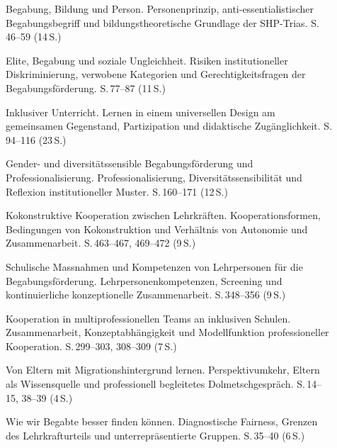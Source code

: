 \documentclass[ngerman, a4paper]{article}
\begin{document}
\begin{description}
  \item[\cite{weigand2021person}] Begabung, Bildung und Person.
        Personenprinzip, anti-essentialistischer Begabungsbegriff und
        bildungstheoretische Grundlage der SHP-Trias. S.\,46--59 (14\,S.)

  \item[\cite{horvath2021elite}] Elite, Begabung und soziale Ungleichheit.
        Risiken institutioneller Diskriminierung, verwobene Kategorien und
        Gerechtigkeitsfragen der Begabungsförderung. S.\,77--87 (11\,S.)

  \item[\cite{muellerboeschschaffnermenn2021udl}] Inklusiver Unterricht.
        Lernen in einem universellen Design am gemeinsamen Gegenstand,
        Partizipation und didaktische Zugänglichkeit. S.\,94--116 (23\,S.)

  \item[\cite{macha2019gender}] Gender- und diversitätssensible
        Begabungsförderung und Professionalisierung. Professionalisierung,
        Diversitätssensibilität und Reflexion institutioneller Muster.
        S.\,160--171 (12\,S.)

  \item[\cite{groschefussangelgraesel2020kokonstruktion}] Kokonstruktive
        Kooperation zwischen Lehrkräften. Kooperationsformen, Bedingungen von
        Kokonstruktion und Verhältnis von Autonomie und Zusammenarbeit.
        S.\,463--467, 469--472 (9\,S.)

  \item[\cite{nguyensliwka2021massnahmen}] Schulische Massnahmen und
        Kompetenzen von Lehrpersonen für die Begabungsförderung.
        Lehrpersonenkompetenzen, Screening und kontinuierliche konzeptionelle
        Zusammenarbeit. S.\,348--356 (9\,S.)

  \item[\cite{widmerwolf2018multiprofessionell}] Kooperation in
        multiprofessionellen Teams an inklusiven Schulen. Zusammenarbeit,
        Konzeptabhängigkeit und Modellfunktion professioneller Kooperation.
        S.\,299--303, 308--309 (7\,S.)

  \item[\cite{kosoroklabhart2021voneltern}] Von Eltern mit
        Migrationshintergrund lernen. Perspektivumkehr, Eltern als
        Wissensquelle und professionell begleitetes Dolmetschgespräch.
        S.\,14--15, 38--39 (4\,S.)

  \item[\cite{baudson2025besserfinden}] Wie wir Begabte besser finden
        können. Diagnostische Fairness, Grenzen des Lehrkrafturteils und
        unterrepräsentierte Gruppen. S.\,35--40 (6\,S.)
\end{description}
\end{document}

